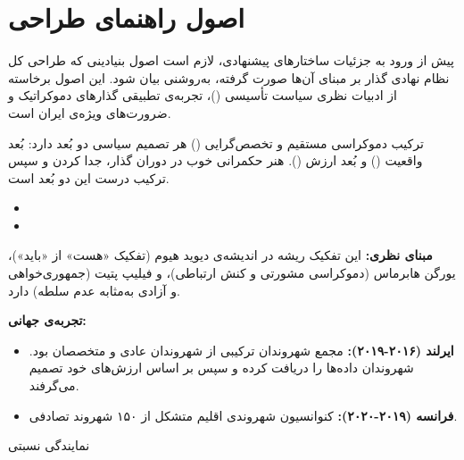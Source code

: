 \chapter{اصول راهنمای طراحی}
پیش از ورود به جزئیات ساختارهای پیشنهادی، لازم است اصول بنیادینی که طراحی کل نظام نهادی گذار بر مبنای آن‌ها صورت گرفته، به‌روشنی بیان شود. این اصول برخاسته از ادبیات نظری سیاست تأسیسی ()، تجربه‌ی تطبیقی گذارهای دموکراتیک و ضرورت‌های ویژه‌ی ایران است.

\begin{principlebox}{ترکیب دموکراسی مستقیم و تخصص‌گرایی ()}
هر تصمیم سیاسی دو بُعد دارد: بُعد واقعیت () و بُعد ارزش (). هنر حکمرانی خوب در دوران گذار، جدا کردن و سپس ترکیب درست این دو بُعد است.
\end{principlebox}

\begin{itemize}
    \item {}
    \item {}
\end{itemize}

\textbf{مبنای نظری:} این تفکیک ریشه در اندیشه‌ی دیوید هیوم (تفکیک «هست» از «باید»)، یورگن هابرماس (دموکراسی مشورتی و کنش ارتباطی)، و فیلیپ پتیت (جمهوری‌خواهی و آزادی به‌مثابه عدم سلطه) دارد.

\textbf{تجربه‌ی جهانی:}
\begin{itemize}
    \item \textbf{ایرلند (۲۰۱۶-۲۰۱۹):} مجمع شهروندان ترکیبی از شهروندان عادی و متخصصان بود. شهروندان داده‌ها را دریافت کرده و سپس بر اساس ارزش‌های خود تصمیم می‌گرفند.
    \item \textbf{فرانسه (۲۰۱۹-۲۰۲۰):} کنوانسیون شهروندی اقلیم متشکل از ۱۵۰ شهروند تصادفی.
\end{itemize}

\begin{principlebox}{نمایندگی نسبتی }
\end{principlebox}


